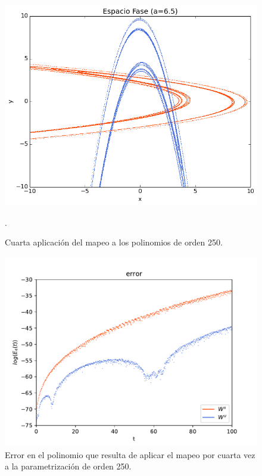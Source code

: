 \begin{figure}[H]
\centering
\includegraphics[scale=0.7]{rectangulo4A}
\caption{Cuarta aplicación del mapeo a los polinomios de orden 250.}.
\label{Rectangulo4}
\end{figure}

\begin{figure}[H]
\centering
\includegraphics[scale=0.7]{error4ite.pdf}
\caption{Error en el polinomio que resulta de aplicar el mapeo por cuarta vez a la parametrización de orden 250.}
\label{error-4iteracion}
\end{figure}

